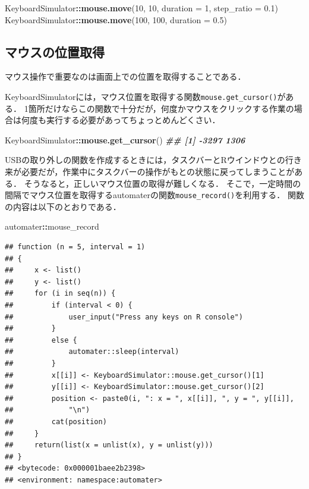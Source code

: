 \documentclass[
]{article}
\newenvironment{Shaded}{\begin{snugshade}}{\end{snugshade}}
\newcommand{\AttributeTok}[1]{\textcolor[rgb]{0.13,0.29,0.53}{#1}}
\newcommand{\DecValTok}[1]{\textcolor[rgb]{0.00,0.00,0.81}{#1}}
\newcommand{\DocumentationTok}[1]{\textcolor[rgb]{0.56,0.35,0.01}{\textbf{\textit{#1}}}}
\newcommand{\FloatTok}[1]{\textcolor[rgb]{0.00,0.00,0.81}{#1}}
\newcommand{\FunctionTok}[1]{\textcolor[rgb]{0.13,0.29,0.53}{\textbf{#1}}}
\newcommand{\NormalTok}[1]{#1}
\newcommand{\SpecialCharTok}[1]{\textcolor[rgb]{0.81,0.36,0.00}{\textbf{#1}}}
\begin{document}
\begin{Shaded}
\begin{Highlighting}[]
\NormalTok{KeyboardSimulator}\SpecialCharTok{::}\FunctionTok{mouse.move}\NormalTok{(}\DecValTok{10}\NormalTok{, }\DecValTok{10}\NormalTok{, }\AttributeTok{duration =} \DecValTok{1}\NormalTok{, }\AttributeTok{step\_ratio =} \FloatTok{0.1}\NormalTok{)}
\NormalTok{KeyboardSimulator}\SpecialCharTok{::}\FunctionTok{mouse.move}\NormalTok{(}\DecValTok{100}\NormalTok{, }\DecValTok{100}\NormalTok{, }\AttributeTok{duration =} \FloatTok{0.5}\NormalTok{)}
\end{Highlighting}
\end{Shaded}

\hypertarget{ux30deux30a6ux30b9ux306eux4f4dux7f6eux53d6ux5f97}{%
\subsection{マウスの位置取得}\label{ux30deux30a6ux30b9ux306eux4f4dux7f6eux53d6ux5f97}}

マウス操作で重要なのは画面上での位置を取得することである．

KeyboardSimulatorには，マウス位置を取得する関数\texttt{mouse.get\_cursor()}がある．
1箇所だけならこの関数で十分だが，何度かマウスをクリックする作業の場合は何度も実行する必要があってちょっとめんどくさい．

\begin{Shaded}
\begin{Highlighting}[]
\NormalTok{KeyboardSimulator}\SpecialCharTok{::}\FunctionTok{mouse.get\_cursor}\NormalTok{()}
 \DocumentationTok{\#\# [1] {-}3297  1306}
\end{Highlighting}
\end{Shaded}

USBの取り外しの関数を作成するときには，タスクバーとRウインドウとの行き来が必要だが，作業中にタスクバーの操作がもとの状態に戻ってしまうことがある．
そうなると，正しいマウス位置の取得が難しくなる．
そこで，一定時間の間隔でマウス位置を取得するautomaterの関数\texttt{mouse\_record()}を利用する．
関数の内容は以下のとおりである．

\begin{Shaded}
\begin{Highlighting}[]
\NormalTok{automater}\SpecialCharTok{::}\NormalTok{mouse\_record}
\end{Highlighting}
\end{Shaded}

\begin{verbatim}
## function (n = 5, interval = 1) 
## {
##     x <- list()
##     y <- list()
##     for (i in seq(n)) {
##         if (interval < 0) {
##             user_input("Press any keys on R console")
##         }
##         else {
##             automater::sleep(interval)
##         }
##         x[[i]] <- KeyboardSimulator::mouse.get_cursor()[1]
##         y[[i]] <- KeyboardSimulator::mouse.get_cursor()[2]
##         position <- paste0(i, ": x = ", x[[i]], ", y = ", y[[i]], 
##             "\n")
##         cat(position)
##     }
##     return(list(x = unlist(x), y = unlist(y)))
## }
## <bytecode: 0x000001baee2b2398>
## <environment: namespace:automater>
\end{verbatim}
\end{document}
